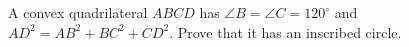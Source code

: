 A convex quadrilateral $ABCD$ has $\angle B=\angle C=120^\circ$ and $AD^2=AB^2+BC^2+CD^2$. Prove that it has an inscribed circle.
